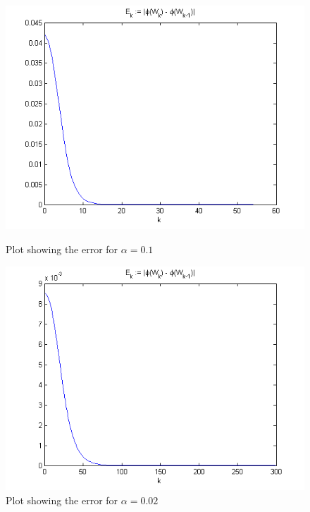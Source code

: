 \begin{figure}[!htbp]
\includegraphics[scale=0.86]{errorstep01.png}
\caption{Plot showing the error for $\alpha=0.1$}
\label{01}

\includegraphics[scale=0.86]{error002.png}
\caption{Plot showing the error for $\alpha=0.02$}
\label{002}
\end{figure}


